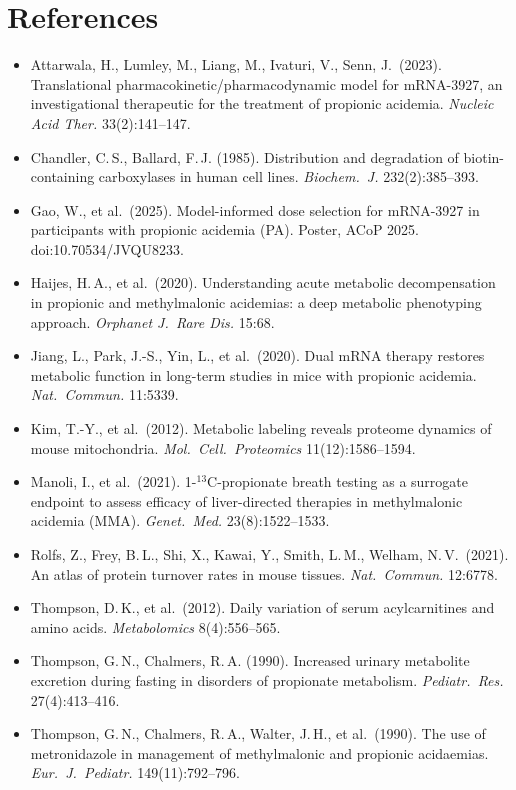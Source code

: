 \documentclass[11pt,a4paper]{article}
\begin{document}
\section*{References}
{\footnotesize\sloppy
\begin{itemize}[leftmargin=1em,label={}]
\item Attarwala, H., Lumley, M., Liang, M., Ivaturi, V., Senn, J.\ (2023). Translational
pharmacokinetic/pharmacodynamic model for mRNA-3927, an investigational therapeutic for the
treatment of propionic acidemia. \emph{Nucleic Acid Ther.} 33(2):141--147.
\item Chandler, C.\,S., Ballard, F.\,J. (1985). Distribution and degradation of
biotin-containing carboxylases in human cell lines. \emph{Biochem.\ J.} 232(2):385--393.
\item Gao, W., et al.\ (2025). Model-informed dose selection for mRNA-3927 in participants with
propionic acidemia (PA). Poster, ACoP 2025. doi:10.70534/JVQU8233.
\item Haijes, H.\,A., et al.\ (2020). Understanding acute metabolic decompensation in propionic and methylmalonic
acidemias: a deep metabolic phenotyping approach. \emph{Orphanet J.\ Rare Dis.} 15:68.
\item Jiang, L., Park, J.-S., Yin, L., et al.\ (2020). Dual mRNA therapy restores metabolic
function in long-term studies in mice with propionic acidemia. \emph{Nat.\ Commun.}
11:5339.
\item Kim, T.-Y., et al.\ (2012). Metabolic labeling reveals proteome dynamics of mouse
mitochondria. \emph{Mol.\ Cell.\ Proteomics} 11(12):1586--1594.
\item Manoli, I., et al.\ (2021). 1-$^{13}$C-propionate breath testing as a surrogate endpoint to
assess efficacy of liver-directed therapies in methylmalonic acidemia (MMA). \emph{Genet.\
Med.} 23(8):1522--1533.
\item Rolfs, Z., Frey, B.\,L., Shi, X., Kawai, Y., Smith, L.\,M., Welham, N.\,V.\ (2021). An atlas
of protein turnover rates in mouse tissues. \emph{Nat.\ Commun.} 12:6778.
\item Thompson, D.\,K., et al.\ (2012). Daily variation of serum acylcarnitines and amino acids.
\emph{Metabolomics} 8(4):556--565.
\item Thompson, G.\,N., Chalmers, R.\,A. (1990). Increased urinary metabolite excretion during
fasting in disorders of propionate metabolism. \emph{Pediatr.\ Res.} 27(4):413--416.
\item Thompson, G.\,N., Chalmers, R.\,A., Walter, J.\,H., et al.\ (1990). The use of
metronidazole in management of methylmalonic and propionic acidaemias. \emph{Eur.\ J.\
Pediatr.} 149(11):792--796.
\end{itemize}}
\end{document}
